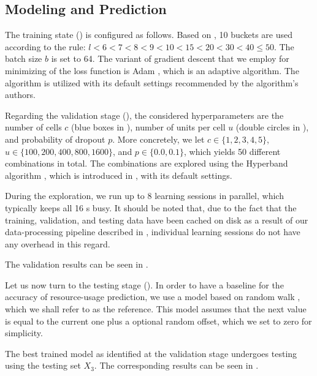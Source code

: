 \subsection{Modeling and Prediction}
The training state () is configured as follows. Based on
, 10 buckets are used according to the rule: $l < 6 < 7 < 8 < 9
< 10 < 15 < 20 < 30 < 40 \leq 50$. The batch size $b$ is set to 64. The variant
of gradient descent that we employ for minimizing of the loss function is Adam
\cite{kingma2014}, which is an adaptive algorithm. The algorithm is utilized
with its default settings recommended by the algorithm's authors.

Regarding the validation stage (), the considered
hyperparameters are the number of cells $c$ (blue boxes in ), number
of units per cell $u$ (double circles in ), and probability of
dropout $p$. More concretely, we let $c \in \{1, 2, 3, 4, 5\}$, $u \in \{100,
200, 400, 800, 1600\}$, and $p \in \{0.0, 0.1\}$, which yields 50 different
combinations in total. The combinations are explored using the Hyperband
algorithm \cite{li2016}, which is introduced in , with its
default settings.


During the exploration, we run up to 8 learning sessions in parallel, which
typically keeps all 16 s busy. It should be noted that, due to the fact
that the training, validation, and testing data have been cached on disk as a
result of our data-processing pipeline described in , individual
learning sessions do not have any overhead in this regard.

The validation results can be seen in .

Let us now turn to the testing stage (). In order to have a
baseline for the accuracy of resource-usage prediction, we use a model based on
random walk \cite{hastie2009}, which we shall refer to as the reference. This
model assumes that the next value is equal to the current one plus a optional
random offset, which we set to zero for simplicity.


The best trained model as identified at the validation stage undergoes testing
using the testing set $X_3$. The corresponding results can be seen in
.
